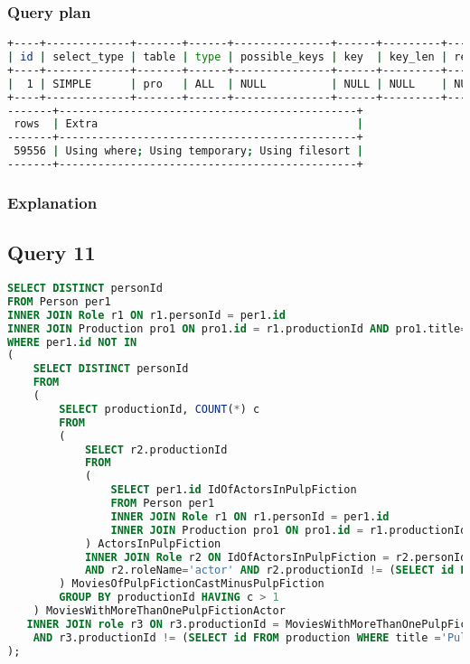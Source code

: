 \subsubsection{Query plan}
\begin{lstlisting}[language=bash]
+----+-------------+-------+------+---------------+------+---------+------+
| id | select_type | table | type | possible_keys | key  | key_len | ref  |
+----+-------------+-------+------+---------------+------+---------+------+
|  1 | SIMPLE      | pro   | ALL  | NULL          | NULL | NULL    | NULL |
+----+-------------+-------+------+---------------+------+---------+------+
-------+----------------------------------------------+
 rows  | Extra                                        |
-------+----------------------------------------------+
 59556 | Using where; Using temporary; Using filesort |
-------+----------------------------------------------+
\end{lstlisting}

\subsubsection{Explanation}


\subsection{Query 11}
\begin{lstlisting}[language=sql]
SELECT DISTINCT personId
FROM Person per1 
INNER JOIN Role r1 ON r1.personId = per1.id
INNER JOIN Production pro1 ON pro1.id = r1.productionId AND pro1.title='Pulp Fiction' AND r1.roleName='actor'
WHERE per1.id NOT IN 
( 
    SELECT DISTINCT personId
    FROM 
    (
        SELECT productionId, COUNT(*) c
        FROM
        (
            SELECT r2.productionId 
            FROM
            (
                SELECT per1.id IdOfActorsInPulpFiction
                FROM Person per1
                INNER JOIN Role r1 ON r1.personId = per1.id
                INNER JOIN Production pro1 ON pro1.id = r1.productionId AND pro1.title='Pulp Fiction' AND r1.roleName='actor'         
            ) ActorsInPulpFiction
            INNER JOIN Role r2 ON IdOfActorsInPulpFiction = r2.personId
            AND r2.roleName='actor' AND r2.productionId != (SELECT id FROM production WHERE title ='Pulp Fiction')
        ) MoviesOfPulpFictionCastMinusPulpFiction
        GROUP BY productionId HAVING c > 1
    ) MoviesWithMoreThanOnePulpFictionActor 
   INNER JOIN role r3 ON r3.productionId = MoviesWithMoreThanOnePulpFictionActor.productionId
    AND r3.productionId != (SELECT id FROM production WHERE title ='Pulp Fiction')
);
\end{lstlisting}


